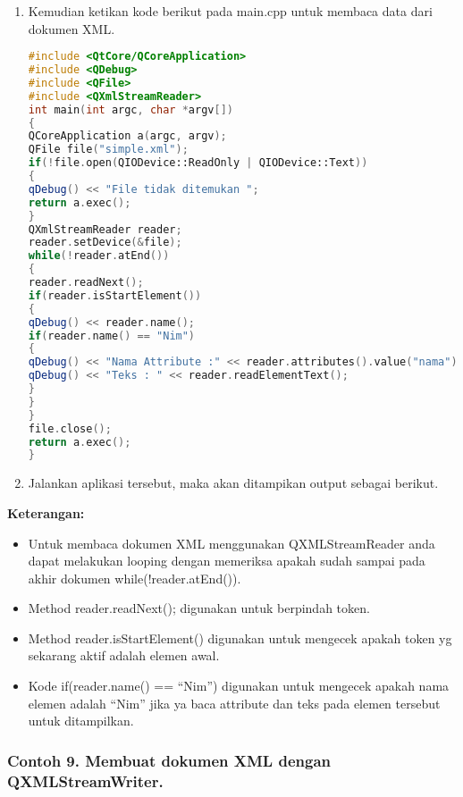 \begin{enumerate}
\def\labelenumi{\arabic{enumi}.}
\setcounter{enumi}{2}
\item
  Kemudian ketikan kode berikut pada main.cpp untuk membaca data dari
  dokumen XML.

\begin{lstlisting}[language=c++]
#include <QtCore/QCoreApplication>
#include <QDebug>
#include <QFile>
#include <QXmlStreamReader>
int main(int argc, char *argv[])
{
QCoreApplication a(argc, argv);
QFile file("simple.xml");
if(!file.open(QIODevice::ReadOnly | QIODevice::Text))
{
qDebug() << "File tidak ditemukan ";
return a.exec();
}
QXmlStreamReader reader;
reader.setDevice(&file);
while(!reader.atEnd())
{
reader.readNext();
if(reader.isStartElement())
{
qDebug() << reader.name();
if(reader.name() == "Nim")
{
qDebug() << "Nama Attribute :" << reader.attributes().value("nama");
qDebug() << "Teks : " << reader.readElementText();
}
}
}
file.close();
return a.exec();
}
\end{lstlisting}
\item
  Jalankan aplikasi tersebut, maka akan ditampikan output sebagai
  berikut.
\end{enumerate}

\textbf{Keterangan:}

\begin{itemize}
\tightlist
\item
  Untuk membaca dokumen XML menggunakan QXMLStreamReader anda dapat
  melakukan looping dengan memeriksa apakah sudah sampai pada akhir
  dokumen while(!reader.atEnd()).
\item
  Method reader.readNext(); digunakan untuk berpindah token.
\item
  Method reader.isStartElement() digunakan untuk mengecek apakah token
  yg sekarang aktif adalah elemen awal.
\item
  Kode if(reader.name() == ``Nim'') digunakan untuk mengecek apakah nama
  elemen adalah ``Nim'' jika ya baca attribute dan teks pada elemen
  tersebut untuk ditampilkan.
\end{itemize}

\subsubsection*{Contoh 9. Membuat dokumen XML dengan QXMLStreamWriter.}

